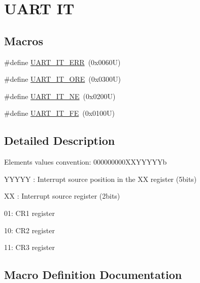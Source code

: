 \hypertarget{group___u_a_r_t___i_t}{}\section{U\+A\+RT IT}
\label{group___u_a_r_t___i_t}
\subsection*{Macros}
\begin{DoxyCompactItemize}
\item 
\#define \hyperlink{group___u_a_r_t___i_t_ga8eb26d8edd9bf78ae8d3ad87dd51b618}{U\+A\+R\+T\+\_\+\+I\+T\+\_\+\+E\+RR}~(0x0060\+U)
\item 
\#define \hyperlink{group___u_a_r_t___i_t_ga333810cb588a739ad49042b9f564a6b2}{U\+A\+R\+T\+\_\+\+I\+T\+\_\+\+O\+RE}~(0x0300\+U)
\item 
\#define \hyperlink{group___u_a_r_t___i_t_ga35c77abdf7744b407d5ba751e546e965}{U\+A\+R\+T\+\_\+\+I\+T\+\_\+\+NE}~(0x0200\+U)
\item 
\#define \hyperlink{group___u_a_r_t___i_t_ga98cbd9e918bcc56f329a803febaab468}{U\+A\+R\+T\+\_\+\+I\+T\+\_\+\+FE}~(0x0100\+U)
\end{DoxyCompactItemize}


\subsection{Detailed Description}
Elements values convention\+: 000000000\+X\+X\+Y\+Y\+Y\+Y\+Yb
\begin{DoxyItemize}
\item Y\+Y\+Y\+YY \+: Interrupt source position in the XX register (5bits)
\item XX \+: Interrupt source register (2bits)
\begin{DoxyItemize}
\item 01\+: C\+R1 register
\item 10\+: C\+R2 register
\item 11\+: C\+R3 register 
\end{DoxyItemize}
\end{DoxyItemize}

\subsection{Macro Definition Documentation}
\mbox{\label{group___u_a_r_t___i_t_ga8eb26d8edd9bf78ae8d3ad87dd51b618}} 
